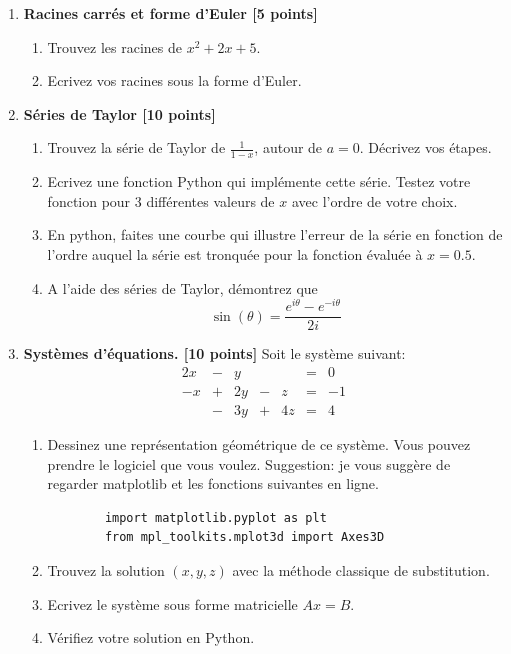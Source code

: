 \documentclass{article}
\begin{document}
\vspace{1cm}
\begin{enumerate}

\item {\bf Racines carrés et forme d'Euler [5 points]}
  \begin{enumerate}
    \item Trouvez les racines de $x^2 + 2x + 5$.

    \item Ecrivez vos racines sous la forme d'Euler.

    \end{enumerate}
\vspace{1cm}
\item {\bf Séries de Taylor [10 points]}
  \begin{enumerate}
    \item Trouvez la série de Taylor de $\displaystyle \frac{1}{1 -
    x}$, autour de $a = 0$. Décrivez vos étapes.

    \item Ecrivez une fonction Python qui implémente cette
      série. Testez votre fonction pour 3 différentes valeurs de $x$
      avec l'ordre de votre choix. 

    \item En python, faites une courbe qui illustre l'erreur de la série en
      fonction de l'ordre auquel la série est tronquée pour la
      fonction évaluée à $x = 0.5$. 

    \item A l'aide des séries de Taylor, démontrez que 
      $$
      \sin(\theta) = \frac{e^{i\theta} - e^{-i\theta}}{2i}
      $$                  
  \end{enumerate}
  
\vspace{1cm}
\item {\bf Systèmes d'équations. [10 points]} Soit le système suivant:
$$
\begin{array}{ccccccc}
2x & - & y  &   &    & = &  0 \\
-x & + & 2y & - & z  & = & -1 \\
   & - & 3y & + & 4z & = &  4
\end{array}
$$
\begin{enumerate}
 \item Dessinez une représentation géométrique de ce système. Vous
   pouvez prendre le logiciel que vous voulez. Suggestion: je vous
   suggère de regarder matplotlib et les fonctions suivantes en ligne.
\begin{verbatim}
        import matplotlib.pyplot as plt 
        from mpl_toolkits.mplot3d import Axes3D
\end{verbatim}
 \item Trouvez la solution $(x,y,z)$ avec la méthode 
   classique de substitution.
 \item Ecrivez le système sous forme matricielle $A x = B$.
 \item Vérifiez votre solution en Python.
\end{enumerate}


\end{enumerate}
\end{document}
